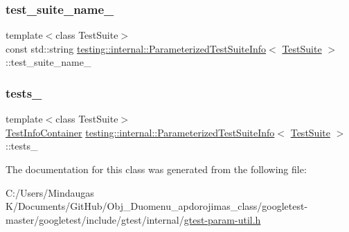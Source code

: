 \subsubsection{\texorpdfstring{test\_suite\_name\_}{test\_suite\_name\_}}
{\footnotesize\ttfamily template$<$class Test\+Suite$>$ \\
const std\+::string \mbox{\hyperlink{classtesting_1_1internal_1_1_parameterized_test_suite_info}{testing\+::internal\+::\+Parameterized\+Test\+Suite\+Info}}$<$ \mbox{\hyperlink{classtesting_1_1_test_suite}{Test\+Suite}} $>$\+::test\+\_\+suite\+\_\+name\+\_\+\hspace{0.3cm}{\ttfamily [private]}}

\mbox{\label{classtesting_1_1internal_1_1_parameterized_test_suite_info_a44e991246e79e6587ffd35533ab4e2d3}} 
\subsubsection{\texorpdfstring{tests\_}{tests\_}}
{\footnotesize\ttfamily template$<$class Test\+Suite$>$ \\
\mbox{\hyperlink{classtesting_1_1internal_1_1_parameterized_test_suite_info_a0578de1b5b1852655771349b785d7fb7}{Test\+Info\+Container}} \mbox{\hyperlink{classtesting_1_1internal_1_1_parameterized_test_suite_info}{testing\+::internal\+::\+Parameterized\+Test\+Suite\+Info}}$<$ \mbox{\hyperlink{classtesting_1_1_test_suite}{Test\+Suite}} $>$\+::tests\+\_\+\hspace{0.3cm}{\ttfamily [private]}}



The documentation for this class was generated from the following file\+:\begin{DoxyCompactItemize}
\item 
C\+:/\+Users/\+Mindaugas K/\+Documents/\+Git\+Hub/\+Obj\+\_\+\+Duomenu\+\_\+apdorojimas\+\_\+class/googletest-\/master/googletest/include/gtest/internal/\mbox{\hyperlink{googletest-master_2googletest_2include_2gtest_2internal_2gtest-param-util_8h}{gtest-\/param-\/util.\+h}}\end{DoxyCompactItemize}
